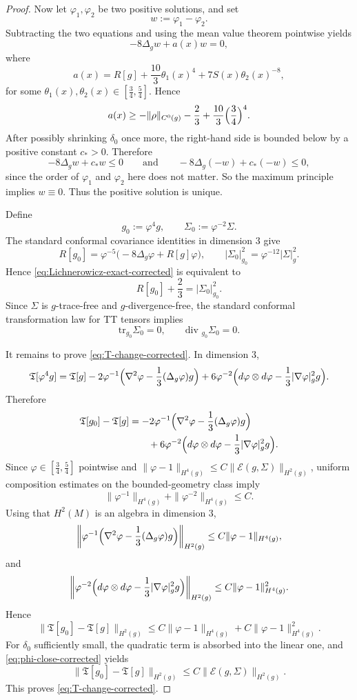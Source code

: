 \documentclass{amsart}
\renewcommand{\div}{\mbox{div }}
\newcommand{\tr}{\mbox{tr}}
\begin{document}
\begin{proof}
\noindent  Now let \(\varphi_{1},\varphi_{2}\) be two positive solutions, and set
\[
w:=\varphi_{1}-\varphi_{2}.
\]
Subtracting the two equations and using the mean value theorem pointwise yields
\[
-8\Delta_{g}w + a(x)w=0,
\]
where
\[
a(x)
=
R[g]
+
\frac{10}{3}\theta_{1}(x)^{4}
+
7S(x)\theta_{2}(x)^{-8},
\]
for some \(\theta_{1}(x),\theta_{2}(x)\in[\frac34,\frac54]\). Hence
\[
a(x)\ge -\|\rho\|_{C^{0}(g)}-\frac23+\frac{10}{3}\Bigl(\frac34\Bigr)^{4}.
\]
After possibly shrinking \(\delta_{0}\) once more, the right-hand side is bounded below by
a positive constant \(c_{*}>0\). Therefore
\[
-8\Delta_{g}w+c_{*}w\le 0
\qquad\text{and}\qquad
-8\Delta_{g}(-w)+c_{*}(-w)\le 0,
\]
since the order of $\varphi_{1}$ and $\varphi_{2}$ here does not matter.
So the maximum principle implies \(w\equiv0\). Thus the positive solution is unique.

\noindent Define
\[
g_{0}:=\varphi^{4}g,\qquad \Sigma_{0}:=\varphi^{-2}\Sigma.
\]
The standard conformal covariance identities in dimension \(3\) give
\[
R[g_{0}]
=
\varphi^{-5}\bigl(-8\Delta_{g}\varphi+R[g]\varphi\bigr),
\qquad
|\Sigma_{0}|_{g_{0}}^{2}
=
\varphi^{-12}|\Sigma|_{g}^{2}.
\]
Hence \eqref{eq:Lichnerowicz-exact-corrected} is equivalent to
\[
R[g_{0}]+\frac23=|\Sigma_{0}|_{g_{0}}^{2}.
\]
Since \(\Sigma\) is \(g\)-trace-free and \(g\)-divergence-free, the standard conformal
transformation law for TT tensors implies
\[
\tr_{g_{0}}\Sigma_{0}=0,
\qquad
\div_{g_{0}}\Sigma_{0}=0.
\]

\noindent It remains to prove \eqref{eq:T-change-corrected}. In dimension \(3\),
\[
\mathfrak T[\varphi^{4}g]
=
\mathfrak T[g]
-
2\varphi^{-1}\Bigl(\nabla^{2}\varphi-\frac13(\Delta_{g}\varphi)g\Bigr)
+
6\varphi^{-2}\Bigl(d\varphi\otimes d\varphi-\frac13|\nabla\varphi|_{g}^{2}g\Bigr).
\]
Therefore
\begin{align*}
\mathfrak T[g_{0}]-\mathfrak T[g]
&=
-2\varphi^{-1}\Bigl(\nabla^{2}\varphi-\frac13(\Delta_{g}\varphi)g\Bigr)\\
&\qquad
+
6\varphi^{-2}\Bigl(d\varphi\otimes d\varphi-\frac13|\nabla\varphi|_{g}^{2}g\Bigr).
\end{align*}
Since \(\varphi\in[\frac34,\frac54]\) pointwise and
\(\|\varphi-1\|_{H^{4}(g)}\le C\|\mathcal E(g,\Sigma)\|_{H^{2}(g)}\), uniform composition
estimates on the bounded-geometry class imply
\[
\|\varphi^{-1}\|_{H^{4}(g)}+\|\varphi^{-2}\|_{H^{4}(g)}\le C.
\]
Using that \(H^{2}(M)\) is an algebra in dimension \(3\),
\[
\left\|
\varphi^{-1}\Bigl(\nabla^{2}\varphi-\frac13(\Delta_{g}\varphi)g\Bigr)
\right\|_{H^{2}(g)}
\le
C\|\varphi-1\|_{H^{4}(g)},
\]
and
\[
\left\|
\varphi^{-2}\Bigl(d\varphi\otimes d\varphi-\frac13|\nabla\varphi|_{g}^{2}g\Bigr)
\right\|_{H^{2}(g)}
\le
C\|\varphi-1\|_{H^{4}(g)}^{2}.
\]
Hence
\[
\|\mathfrak T[g_{0}]-\mathfrak T[g]\|_{H^{2}(g)}
\le
C\|\varphi-1\|_{H^{4}(g)}
+
C\|\varphi-1\|_{H^{4}(g)}^{2}.
\]
For \(\delta_{0}\) sufficiently small, the quadratic term is absorbed into the linear one,
and \eqref{eq:phi-close-corrected} yields
\[
\|\mathfrak T[g_{0}]-\mathfrak T[g]\|_{H^{2}(g)}
\le
C\|\mathcal E(g,\Sigma)\|_{H^{2}(g)}.
\]
This proves \eqref{eq:T-change-corrected}.


\end{proof}
\end{document}
